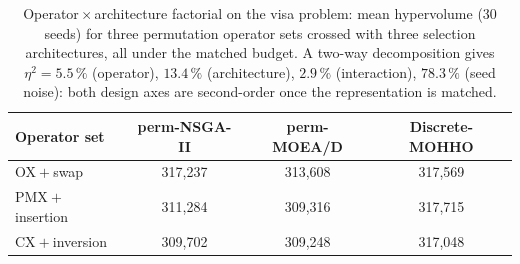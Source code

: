 \documentclass[runningheads]{llncs}
\begin{document}
\begin{table}[t]
\centering
\caption{Operator${}\times{}$architecture factorial on the visa problem: mean hypervolume (30 seeds) for three permutation operator sets crossed with three selection architectures, all under the matched budget. A two-way decomposition gives $\eta^2=5.5\,\%$ (operator), $13.4\,\%$ (architecture), $2.9\,\%$ (interaction), $78.3\,\%$ (seed noise): both design axes are second-order once the representation is matched.}
\label{tab:factorial}
\small
\begin{tabular}{lccc}
\toprule
\textbf{Operator set} & \textbf{perm-NSGA-II} & \textbf{perm-MOEA/D} & \textbf{Discrete-MOHHO}\\
\midrule
OX${}+{}$swap        & 317{,}237 & 313{,}608 & 317{,}569\\
PMX${}+{}$insertion  & 311{,}284 & 309{,}316 & 317{,}715\\
CX${}+{}$inversion   & 309{,}702 & 309{,}248 & 317{,}048\\
\bottomrule
\end{tabular}
\end{table}
\end{document}
